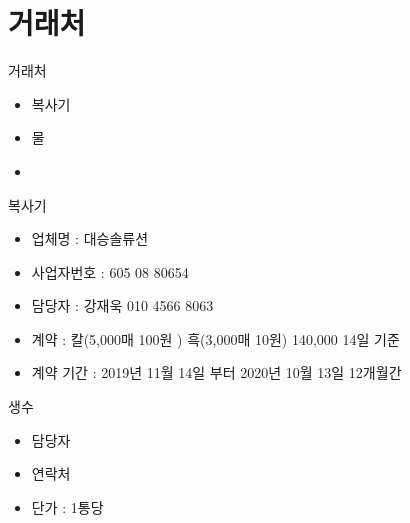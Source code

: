 \documentclass[aspectratio=1610,17pt,xcolor=pdftex,dvipsnames,table,handout]{beamer}
\begin{document}
		\section{거래처}
		\frame [plain] {\sectionpage}
		

		\begin{frame} [t,plain]
			\begin{block} {거래처 }
			\begin{itemize}
				\item 복사기 
				\item 물
				\item  
			\end{itemize}
			
			\end{block}
		\end{frame}

		\begin{frame} [t,plain]
			\begin{block} {복사기 }
			\begin{itemize}
				\item 업체명 : 대승솔류션
				\item 사업자번호 : 605  08 80654 
				\item 담당자   :  강재욱 010 4566  8063
				\item  계약 : 칼(5,000매 100원 ) 흑(3,000매 10원)  140,000 14일 기준
				\item  계약 기간 : 2019년 11월 14일 부터 2020년 10월 13일 12개월간 
			\end{itemize}
			\end{block}
		\end{frame}

		\begin{frame} [t,plain]
			\begin{block} {생수 }
			\begin{itemize}
				\item 담당자 
				\item 연락처
				\item  단가 :  1통당 
			\end{itemize}
			\end{block}
		\end{frame}


\end{document}
